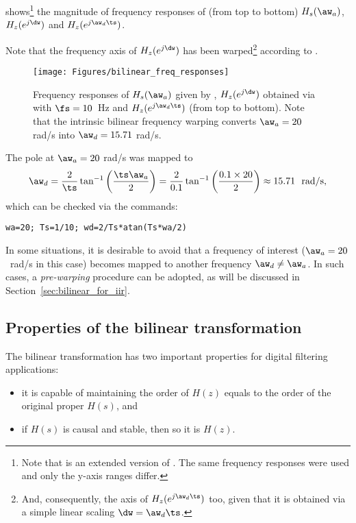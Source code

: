  shows\footnote{Note that  is an extended version of . The same frequency responses were used and only the y-axis ranges differ.}
 the magnitude of frequency responses of (from top to bottom) $H_s(\aw_a)$, $H_z(e^{j\dw})$ and $H_z(e^{j\aw_d \ts})$.

Note that the frequency axis of $H_z(e^{j\dw})$ has been warped\footnote{And, consequently, the axis of $H_z(e^{j\aw_d \ts})$ too, given that it is obtained via a simple linear scaling $\dw=\aw_d \ts$.} according to .

\begin{figure}
\centering
\texttt{[image: Figures/bilinear\_freq\_responses]}
\caption[{Frequency responses of $H_s(\aw_a)$ given by , $H_z(e^{j\dw})$ obtained via  and $H_z(e^{j\aw_d \ts})$ (from top to bottom).}]{Frequency responses of $H_s(\aw_a)$ given by , $H_z(e^{j\dw})$ obtained via  with $\fs=10$~Hz and $H_z(e^{j\aw_d \ts})$ (from top to bottom). Note that the intrinsic bilinear frequency warping converts $\aw_a=20$ rad/s into $\aw_d=15.71$ rad/s.\label{fig:bilinear_freq_responses}}
\end{figure}

The pole at $\aw_a = 20$ rad/s was mapped to
\[
\aw_d = \frac{2}{\ts} \tan^{-1} \left( \frac{\ts \aw_a}{2} \right) = \frac{2}{0.1} \tan^{-1} \left( \frac{0.1 \times 20}{2} \right) \approx 15.71 \textrm{~~rad/s},
\]
which can be checked via the commands:
\begin{lstlisting}
wa=20; Ts=1/10; wd=2/Ts*atan(Ts*wa/2)
\end{lstlisting}
In some situations, it is desirable to avoid that a frequency of interest ($\aw_a = 20$~rad/s in this case) becomes mapped to another frequency $\aw_d \ne \aw_a$. In such cases, a \emph{pre-warping}
procedure can be adopted, as will be discussed in Section~\ref{sec:bilinear_for_iir}.
\eExample

\subsection{{\akadvanced} Properties of the bilinear transformation}
\label{sec:bilinear_properties}

The bilinear transformation has two important properties for digital filtering applications:
\begin{itemize}
	\item it is capable of maintaining 
the order of $H(z)$ equals to the order of the original proper $H(s)$, and
  \item if $H(s)$ is causal and stable, then so it is $H(z)$.
\end{itemize}

